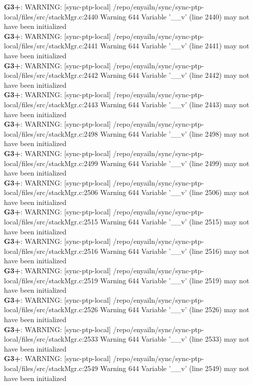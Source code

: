 \documentclass[12pt,twoside]{article}
\begin{document}
\textbf{G3+}: WARNING: [sync-ptp-local] /repo/enyailn/sync/sync-ptp-local/files/src/stackMgr.c:2440 Warning 644 Variable '\_\_v' (line 2440) may not have been initialized\\ 
\textbf{G3+}: WARNING: [sync-ptp-local] /repo/enyailn/sync/sync-ptp-local/files/src/stackMgr.c:2441 Warning 644 Variable '\_\_v' (line 2441) may not have been initialized\\ 
\textbf{G3+}: WARNING: [sync-ptp-local] /repo/enyailn/sync/sync-ptp-local/files/src/stackMgr.c:2442 Warning 644 Variable '\_\_v' (line 2442) may not have been initialized\\ 
\textbf{G3+}: WARNING: [sync-ptp-local] /repo/enyailn/sync/sync-ptp-local/files/src/stackMgr.c:2443 Warning 644 Variable '\_\_v' (line 2443) may not have been initialized\\ 
\textbf{G3+}: WARNING: [sync-ptp-local] /repo/enyailn/sync/sync-ptp-local/files/src/stackMgr.c:2498 Warning 644 Variable '\_\_v' (line 2498) may not have been initialized\\ 
\textbf{G3+}: WARNING: [sync-ptp-local] /repo/enyailn/sync/sync-ptp-local/files/src/stackMgr.c:2499 Warning 644 Variable '\_\_v' (line 2499) may not have been initialized\\ 
\textbf{G3+}: WARNING: [sync-ptp-local] /repo/enyailn/sync/sync-ptp-local/files/src/stackMgr.c:2506 Warning 644 Variable '\_\_v' (line 2506) may not have been initialized\\ 
\textbf{G3+}: WARNING: [sync-ptp-local] /repo/enyailn/sync/sync-ptp-local/files/src/stackMgr.c:2515 Warning 644 Variable '\_\_v' (line 2515) may not have been initialized\\ 
\textbf{G3+}: WARNING: [sync-ptp-local] /repo/enyailn/sync/sync-ptp-local/files/src/stackMgr.c:2516 Warning 644 Variable '\_\_v' (line 2516) may not have been initialized\\ 
\textbf{G3+}: WARNING: [sync-ptp-local] /repo/enyailn/sync/sync-ptp-local/files/src/stackMgr.c:2519 Warning 644 Variable '\_\_v' (line 2519) may not have been initialized\\ 
\textbf{G3+}: WARNING: [sync-ptp-local] /repo/enyailn/sync/sync-ptp-local/files/src/stackMgr.c:2526 Warning 644 Variable '\_\_v' (line 2526) may not have been initialized\\ 
\textbf{G3+}: WARNING: [sync-ptp-local] /repo/enyailn/sync/sync-ptp-local/files/src/stackMgr.c:2533 Warning 644 Variable '\_\_v' (line 2533) may not have been initialized\\ 
\textbf{G3+}: WARNING: [sync-ptp-local] /repo/enyailn/sync/sync-ptp-local/files/src/stackMgr.c:2549 Warning 644 Variable '\_\_v' (line 2549) may not have been initialized\\ 
\end{document}
